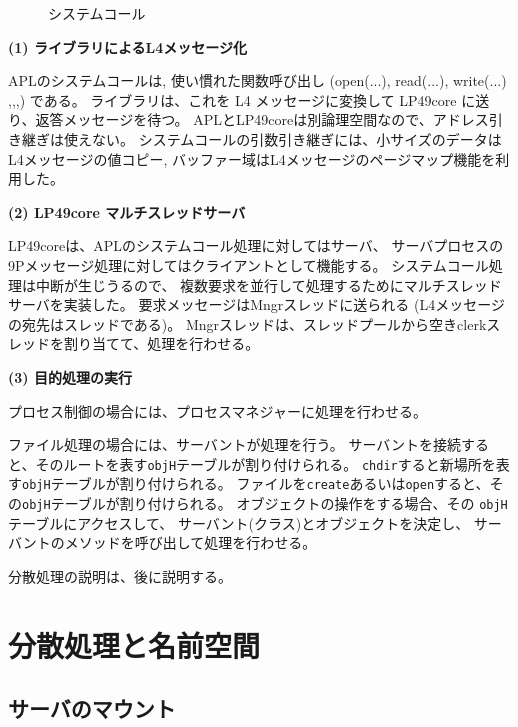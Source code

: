 \documentclass{ipsjpapers}
\begin{document}
\begin{figure}[htb]
  \begin{center}
   \epsfxsize=340pt
    \caption{システムコール}
    \label{fig:LP49syscall}
  \end{center}
\end{figure}

{\bf (1) ライブラリによるL4メッセージ化}

   APLのシステムコールは, 使い慣れた関数呼び出し (open(...), read(...), write(...) ,,,) 
  である。
  ライブラリは、これを L4 メッセージに変換して LP49core に送り、返答メッセージを待つ。
  APLとLP49coreは別論理空間なので、アドレス引き継ぎは使えない。
  システムコールの引数引き継ぎには、小サイズのデータはL4メッセージの値コピー, 
  バッファー域はL4メッセージのページマップ機能を利用した。


{\bf (2) LP49core マルチスレッドサーバ}

    LP49coreは、APLのシステムコール処理に対してはサーバ、
    サーバプロセスの9Pメッセージ処理に対してはクライアントとして機能する。
    システムコール処理は中断が生じうるので、
    複数要求を並行して処理するためにマルチスレッドサーバを実装した。
    要求メッセージはMngrスレッドに送られる
    (L4メッセージの宛先はスレッドである)。
    Mngrスレッドは、スレッドプールから空きclerkスレッドを割り当てて、処理を行わせる。

{\bf (3) 目的処理の実行}
  
    プロセス制御の場合には、プロセスマネジャーに処理を行わせる。

    ファイル処理の場合には、サーバントが処理を行う。
    サーバントを接続すると、そのルートを表す{\tt objH}テーブルが割り付けられる。
    {\tt chdir}すると新場所を表す{\tt objH}テーブルが割り付けられる。
    ファイルを{\tt create}あるいは{\tt open}すると、その{\tt objH}テーブルが割り付けられる。
    オブジェクトの操作をする場合、その {\tt objH}テーブルにアクセスして、
    サーバント(クラス)とオブジェクトを決定し、
    サーバントのメソッドを呼び出して処理を行わせる。

    分散処理の説明は、後に説明する。


\section{分散処理と名前空間}

\subsection{サーバのマウント}
\end{document}
